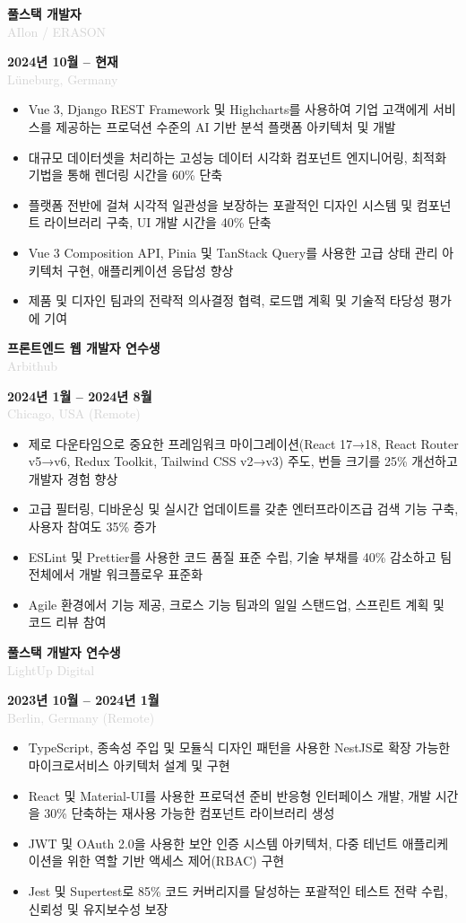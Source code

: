 \documentclass[10pt,a4paper]{article}
\newcommand{\Experience}[4]{%
  \vspace{2pt}
  \noindent
  \begin{minipage}[t]{0.70\textwidth}
    {\normalsize\textbf{\color{darkgray}#3}} \\
    \textcolor{lightgray}{\small #1}
  \end{minipage}%
  \hfill
  \begin{minipage}[t]{0.28\textwidth}
    \raggedleft
    \textcolor{mediumgray}{\small\textbf{#4}} \\
    \textcolor{lightgray}{\small #2}
  \end{minipage}
  \vspace{1pt}
}
\begin{document}
\Experience{AIlon / ERASON}{Lüneburg, Germany}{풀스택 개발자}{2024년 10월 -- 현재}
\begin{itemize}
  \item Vue 3, Django REST Framework 및 Highcharts를 사용하여 기업 고객에게 서비스를 제공하는 프로덕션 수준의 AI 기반 분석 플랫폼 아키텍처 및 개발
  \item 대규모 데이터셋을 처리하는 고성능 데이터 시각화 컴포넌트 엔지니어링, 최적화 기법을 통해 렌더링 시간을 60\% 단축
  \item 플랫폼 전반에 걸쳐 시각적 일관성을 보장하는 포괄적인 디자인 시스템 및 컴포넌트 라이브러리 구축, UI 개발 시간을 40\% 단축
  \item Vue 3 Composition API, Pinia 및 TanStack Query를 사용한 고급 상태 관리 아키텍처 구현, 애플리케이션 응답성 향상
  \item 제품 및 디자인 팀과의 전략적 의사결정 협력, 로드맵 계획 및 기술적 타당성 평가에 기여
\end{itemize}

\Experience{Arbithub}{Chicago, USA (Remote)}{프론트엔드 웹 개발자 연수생}{2024년 1월 -- 2024년 8월}
\begin{itemize}
  \item 제로 다운타임으로 중요한 프레임워크 마이그레이션(React 17→18, React Router v5→v6, Redux Toolkit, Tailwind CSS v2→v3) 주도, 번들 크기를 25\% 개선하고 개발자 경험 향상
  \item 고급 필터링, 디바운싱 및 실시간 업데이트를 갖춘 엔터프라이즈급 검색 기능 구축, 사용자 참여도 35\% 증가
  \item ESLint 및 Prettier를 사용한 코드 품질 표준 수립, 기술 부채를 40\% 감소하고 팀 전체에서 개발 워크플로우 표준화
  \item Agile 환경에서 기능 제공, 크로스 기능 팀과의 일일 스탠드업, 스프린트 계획 및 코드 리뷰 참여
\end{itemize}

\Experience{LightUp Digital}{Berlin, Germany (Remote)}{풀스택 개발자 연수생}{2023년 10월 -- 2024년 1월}
\begin{itemize}
  \item TypeScript, 종속성 주입 및 모듈식 디자인 패턴을 사용한 NestJS로 확장 가능한 마이크로서비스 아키텍처 설계 및 구현
  \item React 및 Material-UI를 사용한 프로덕션 준비 반응형 인터페이스 개발, 개발 시간을 30\% 단축하는 재사용 가능한 컴포넌트 라이브러리 생성
  \item JWT 및 OAuth 2.0을 사용한 보안 인증 시스템 아키텍처, 다중 테넌트 애플리케이션을 위한 역할 기반 액세스 제어(RBAC) 구현
  \item Jest 및 Supertest로 85\% 코드 커버리지를 달성하는 포괄적인 테스트 전략 수립, 신뢰성 및 유지보수성 보장
\end{itemize}
\end{document}
